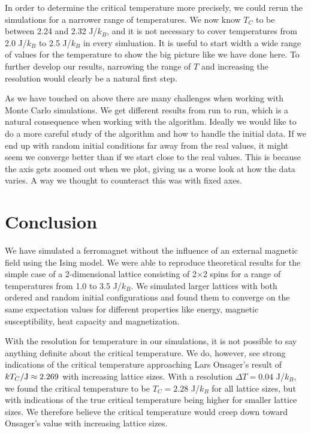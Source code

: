 \documentclass[reprint, english,notitlepage,nofootinbib]{revtex4-1}  %
\begin{document}
In order to determine the critical temperature more precisely, we could rerun the simulations for a narrower range of temperatures. We now know $T_C$ to be between 2.24 and 2.32 J/$k_B$, and it is not necessary to cover temperatures from 2.0 J/$k_B$ to 2.5 J/$k_B$ in every simluation. It is useful to start width a wide range of values for the temperature to show the big picture like we have done here. To further develop our results, narrowing the range of $T$ and increasing the resolution would clearly be a natural first step.

As we have touched on above there are many challenges when working with Monte Carlo simulations. We get different results from run to run, which is a natural consequence when working with the algorithm. Ideally we would like to do a more careful study of the algorithm and how to handle the initial data. If we end up with random initial conditions far away from the real values, it might seem we converge better than if we start close to the real values. This is because the axis gets zoomed out when we plot, giving us a worse look at how the data varies. A way we thought to counteract this was with fixed axes.



\section{Conclusion}

We have simulated a ferromagnet without the influence of an external magnetic field using the Ising model. We were able to reproduce theoretical results for the simple case of a 2-dimensional lattice consisting of 2$\times$2 spins for a range of temperatures from 1.0 to 3.5 J/$k_B$. We simulated larger lattices with both ordered and random initial configurations and found them to converge on the same expectation values for different properties like energy, magnetic susceptibility, heat capacity and magnetization.

With the resolution for temperature in our simulations, it is not possible to say anything definite about the critical temperature. We do, however, see strong indications of the critical temperature approaching Lars Onsager's result of $kT_C/\rm{J} \approx 2.269$ with increasing lattice sizes. With a resolution $\Delta T = 0.04$ J/$k_B$, we found the critical temperature to be $T_C = 2.28$ J/$k_B$ for all lattice sizes, but with indications of the true critical temperature being higher for smaller lattice sizes. We therefore believe the critical temperature would creep down toward Onsager's value with increasing lattice sizes.
\end{document}
